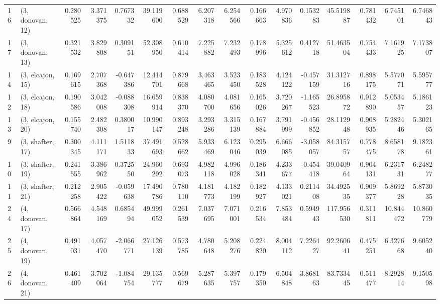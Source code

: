 \begin{tabular}{llrrrrrrrrrrrrrr}
16 &  (3, donovan, 12) &   0.280525 &  3.371375 &  0.767332 &  39.119600 &  0.688529 &   6.207318 &  6.254566 &  0.166663 &  4.970836 &  0.153283 &   45.519887 &  0.781432 &   6.745101 &   6.746843 \\
17 &  (3, donovan, 13) &   0.321532 &  3.829808 &  0.309151 &  52.308950 &  0.610414 &   7.225882 &  7.232493 &  0.178996 &  5.325612 &  0.412718 &   51.463504 &  0.754433 &   7.161925 &   7.173807 \\
14 &  (3, elcajon, 15) &   0.169615 &  2.707368 & -0.647386 &  12.414701 &  0.879668 &   3.463465 &  3.523450 &  0.183528 &  4.124122 & -0.457159 &   31.312716 &  0.898175 &   5.577071 &   5.595777 \\
12 &  (3, elcajon, 18) &   0.190586 &  3.042008 & -0.088308 &  16.659914 &  0.838370 &   4.080700 &  4.081656 &  0.165026 &  3.720267 & -1.165523 &   26.895872 &  0.912890 &   5.053457 &   5.186123 \\
13 &  (3, elcajon, 20) &   0.155740 &  2.482308 &  0.380017 &  10.990147 &  0.893248 &   3.293286 &  3.315139 &  0.167884 &  3.791999 & -0.456852 &   28.112948 &  0.908935 &   5.282446 &   5.302165 \\
9  &  (3, shafter, 17) &   0.300345 &  4.111171 &  1.511833 &  37.491693 &  0.528662 &   5.933469 &  6.123046 &  0.295039 &  6.666085 & -3.058057 &   84.315757 &  0.778475 &   8.658178 &   9.182361 \\
10 &  (3, shafter, 19) &   0.241555 &  3.386962 &  0.372550 &  24.960292 &  0.693073 &   4.982118 &  4.996028 &  0.186341 &  4.233677 & -0.454418 &   39.040964 &  0.904131 &   6.231731 &   6.248277 \\
11 &  (3, shafter, 21) &   0.212258 &  2.905422 & -0.059638 &  17.490786 &  0.780110 &   4.181773 &  4.182199 &  0.182927 &  4.133021 &  0.211408 &   34.492535 &  0.909377 &   5.869228 &   5.873035 \\
24 &  (4, donovan, 17) &   0.566864 &  4.548169 &  0.685494 &  49.999052 &  0.261539 &   7.037695 &  7.071001 &  0.216534 &  7.853484 &  0.594943 &  117.956530 &  0.311811 &  10.844472 &  10.860779 \\
25 &  (4, donovan, 19) &   0.491031 &  4.057470 & -2.066771 &  27.126139 &  0.573785 &   4.780648 &  5.208276 &  0.224820 &  8.004112 &  7.226427 &   92.260641 &  0.475251 &   6.327668 &   9.605240 \\
26 &  (4, donovan, 21) &   0.461409 &  3.702064 & -1.084754 &  29.135777 &  0.569679 &   5.287635 &  5.397757 &  0.179350 &  6.504848 &  3.868163 &   83.733445 &  0.511477 &   8.292814 &   9.150598 \\

\end{tabular}
